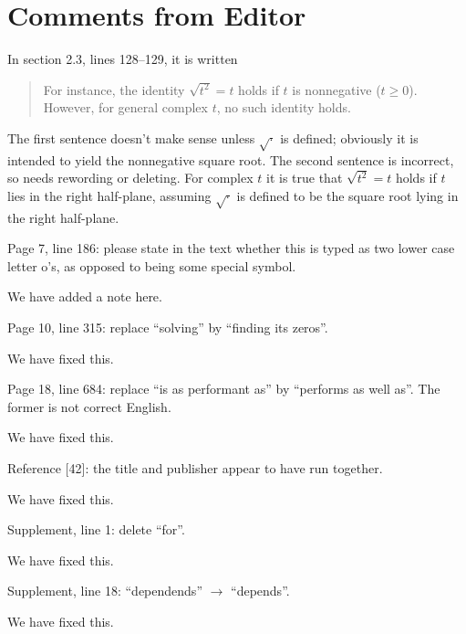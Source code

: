 \documentclass[answers,12pt]{exam}
\begin{document}


\section{Comments from Editor}

\begin{questions}
\question  In section 2.3, lines 128–129, it is written
\begin{quote}
For instance, the identity $\sqrt{t^2} = t$ holds if $t$ is nonnegative ($t \geq
0$). However, for general complex $t$, no such identity holds.
\end{quote}
The first sentence doesn’t make sense unless $\sqrt{\cdot}$ is defined;
obviously it is intended to yield the nonnegative square root. The second
sentence is incorrect, so needs rewording or deleting. For complex $t$ it is
true that $\sqrt{t^2} = t$ holds if $t$ lies in the right half-plane, assuming
$\sqrt{\cdot}$ is defined to be the square root lying in the right half-plane.
\begin{solution}

\end{solution}

\question Page 7, line 186: please state in the text whether this is typed as two lower case letter o's, as opposed to being some special symbol.
\begin{solution}
We have added a note here.
\end{solution}

\question Page 10, line 315: replace ``solving'' by ``finding its zeros''.
\begin{solution}
We have fixed this.
\end{solution}

\question Page 18, line 684: replace ``is as performant as'' by ``performs as well as''. The former is not correct English.
\begin{solution}
We have fixed this.
\end{solution}

\question Reference [42]: the title and publisher appear to have run together.
\begin{solution}
We have fixed this.
\end{solution}

\question Supplement, line 1: delete ``for''.
\begin{solution}
We have fixed this.
\end{solution}

\question Supplement, line 18: ``dependends'' $\rightarrow$ ``depends''.
\begin{solution}
We have fixed this.
\end{solution}

\end{questions}
\end{document}
